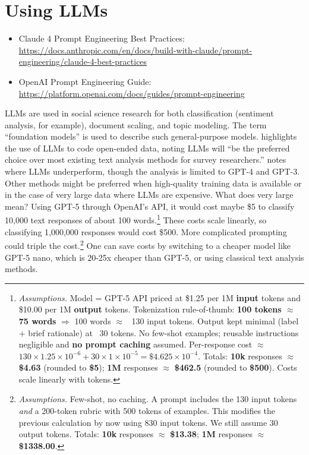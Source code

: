 \section{Using LLMs}

\begin{readingbox}
\begin{itemize}
\item Claude 4 Prompt Engineering Best Practices: \url{https://docs.anthropic.com/en/docs/build-with-claude/prompt-engineering/claude-4-best-practices}
\item OpenAI Prompt Engineering Guide: \url{https://platform.openai.com/docs/guides/prompt-engineering}
\end{itemize}
\end{readingbox}

LLMs are used in social science research for both classification (sentiment analysis, for example), document scaling, and topic modeling. The term ``foundation models'' is used to describe such general-purpose models. \cite{haaland2025understanding} highlights the use of LLMs to code open-ended data, noting LLMs will ``be the preferred choice over most existing text analysis methods for survey researchers.'' \cite{ornstein2025train} notes where LLMs underperform, though the analysis is limited to GPT-4 and GPT-3. Other methods might be preferred when high-quality training data is available or in the case of very large data where LLMs are expensive. What does very large mean? Using GPT-5 through OpenAI's API, it would cost maybe \$5 to classify 10,000 text responses of about 100 words.\footnote{\textit{Assumptions.} Model = GPT-5 API priced at \$1.25 per 1M \textbf{input} tokens and \$10.00 per 1M \textbf{output} tokens. Tokenization rule-of-thumb: \textbf{100 tokens $\approx$ 75 words} $\Rightarrow$ 100 words $\approx$ ~130 input tokens. Output kept minimal (label + brief rationale) at ~30 tokens. No few-shot examples; reusable instructions negligible and \textbf{no prompt caching} assumed. Per-response cost $\approx$ \(130 \times 1.25 \times 10^{-6} + 30 \times 1 \times 10^{-5} = \$4.625 \times 10^{-4}\). Totals: \textbf{10k} responses $\approx$ \textbf{\$4.63} (rounded to \textbf{\$5}); \textbf{1M} responses $\approx$ \textbf{\$462.5} (rounded to \textbf{\$500}). Costs scale linearly with tokens.} These costs scale linearly, so classifying 1,000,000 responses would cost \$500. More complicated prompting could triple the cost.\footnote{\textit{Assumptions.} Few-shot, no caching. A prompt includes the 130 input tokens \textit{and} a 200-token rubric with 500 tokens of examples. This modifies the previous calculation by now using 830 input tokens. We still assume 30 output tokens. Totals: \textbf{10k} responses $\approx$ \textbf{\$13.38}; \textbf{1M} responses $\approx$ \textbf{\$1338.00}.} One can save costs by switching to a cheaper model like GPT-5 nano, which is 20-25x cheaper than GPT-5, or using classical text analysis methods.


